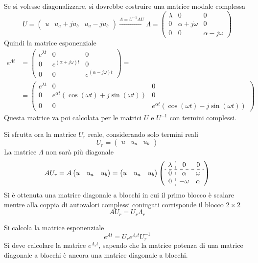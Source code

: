 Se si volesse diagonalizzare, si dovrebbe costruire una matrice modale complessa
$$
U=\begin{pmatrix}u & u_a+ju_b & u_a-ju_b\end{pmatrix}
\stackrel{\Lambda=U^{-1}AU}{\rightarrow}\Lambda=
\begin{pmatrix}
\lambda & 0 & 0\\
0 & \alpha+j\omega & 0 \\
0 & 0 & \alpha -j\omega
\end{pmatrix}
$$
Quindi la matrice esponenziale
$$\begin{aligned}
e^{\Lambda t} &= \begin{pmatrix}
e^{\lambda t} & 0 & 0 \\
0 & e^{(\alpha +j\omega)t} & 0 \\
0 & 0 & e^{(\alpha - j\omega)t}
\end{pmatrix} =\\
&=\begin{pmatrix}
e^{\lambda t} & 0 & 0 \\
0 & e^{\alpha t}(\cos(\omega t) + j\sin(\omega t)) & 0\\
0 & 0 & e^{\alpha t}(\cos(\omega t) - j\sin(\omega t))
\end{pmatrix}
\end{aligned}$$
Questa matrice va poi calcolata per le matrici $U$ e $U^{-1}$ con termini
complessi.

Si sfrutta ora la matrice $U_r$ reale, considerando solo termini reali
$$
U_r = \begin{pmatrix}
u & u_a & u_b
\end{pmatrix}
$$
La matrice $\Lambda$ non sarà più diagonale
$$
AU_r = A\begin{pmatrix}
u & u_a & u_b
\end{pmatrix} =
\begin{pmatrix}
u & u_a & u_b
\end{pmatrix}\left(
\begin{array}{c:cc}
\lambda & 0 & 0\\ \hdashline
0 &\alpha &\omega \\
0 &-\omega &\alpha \\
\end{array}\right)
$$
Si è ottenuta una matrice diagonale a blocchi in cui il primo blocco è scalare
mentre alla coppia di autovalori complessi coniugati corrisponde il blocco
$2\times2$
$$
AU_r = U_r \Lambda_r
$$

Si calcola la matrice esponenziale
$$
e^{At} = U_r e^{\Lambda_r t}U_r^{-1}
$$
Si deve calcolare la matrice $e^{\Lambda_r t}$, sapendo che la matrice potenza
di una matrice diagonale a blocchi è ancora una matrice diagonale a blocchi.

